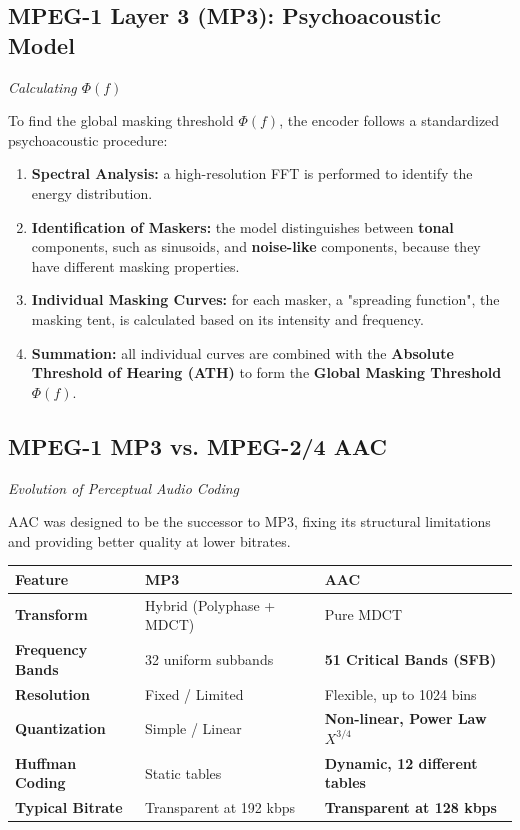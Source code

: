 \subsection{MPEG-1 Layer 3 (MP3): Psychoacoustic Model}

\textit{Calculating $\Phi(f)$}

To find the global masking threshold $\Phi(f)$, the encoder follows a standardized psychoacoustic procedure:

\begin{enumerate}
\item \textbf{Spectral Analysis:} a high-resolution FFT is performed to identify the energy distribution.
\item \textbf{Identification of Maskers:} the model distinguishes between \textbf{tonal} components, such as sinusoids, and \textbf{noise-like} components, because they have different masking properties.
\item \textbf{Individual Masking Curves:} for each masker, a "spreading function", the masking tent, is calculated based on its intensity and frequency.
\item \textbf{Summation:} all individual curves are combined with the \textbf{Absolute Threshold of Hearing (ATH)} to form the \textbf{Global Masking Threshold} $\Phi(f)$.
\end{enumerate}

\subsection{MPEG-1 MP3 vs. MPEG-2/4 AAC}

\textit{Evolution of Perceptual Audio Coding}

AAC was designed to be the successor to MP3, fixing its structural limitations and providing better quality at lower bitrates.

\begin{center}
\begin{tabular}{|l|l|l|}
\hline
\textbf{Feature} & \textbf{MP3} & \textbf{AAC} \\ \hline
\textbf{Transform} & Hybrid (Polyphase + MDCT) & Pure MDCT \\ \hline
\textbf{Frequency Bands} & 32 uniform subbands & \textbf{51 Critical Bands (SFB)} \\ \hline
\textbf{Resolution} & Fixed / Limited & Flexible, up to 1024 bins \\ \hline
\textbf{Quantization} & Simple / Linear & \textbf{Non-linear, Power Law $X^{3/4}$} \\ \hline
\textbf{Huffman Coding} & Static tables & \textbf{Dynamic, 12 different tables} \\ \hline
\textbf{Typical Bitrate} & Transparent at 192 kbps & \textbf{Transparent at 128 kbps} \\ \hline
\end{tabular}
\end{center}

